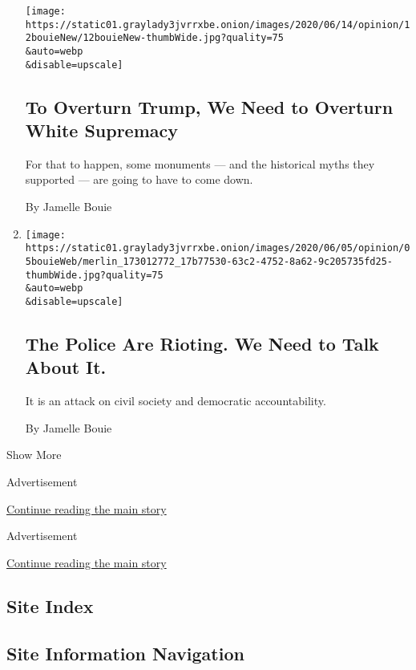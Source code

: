 \begin{enumerate}
  \texttt{[image: https://static01.graylady3jvrrxbe.onion/images/2020/06/14/opinion/12bouieNew/12bouieNew-thumbWide.jpg?quality=75\\\&auto=webp\\\&disable=upscale]}

  \hypertarget{to-overturn-trump-we-need-to-overturn-white-supremacy}{%
  \subsection{To Overturn Trump, We Need to Overturn White
  Supremacy}\label{to-overturn-trump-we-need-to-overturn-white-supremacy}}

  For that to happen, some monuments --- and the historical myths they
  supported --- are going to have to come down.

  By Jamelle Bouie
\item
  \href{/2020/06/05/opinion/sunday/police-riots.html}{}

  \texttt{[image: https://static01.graylady3jvrrxbe.onion/images/2020/06/05/opinion/05bouieWeb/merlin\_173012772\_17b77530-63c2-4752-8a62-9c205735fd25-thumbWide.jpg?quality=75\\\&auto=webp\\\&disable=upscale]}

  \hypertarget{the-police-are-rioting-we-need-to-talk-about-it}{%
  \subsection{The Police Are Rioting. We Need to Talk About
  It.}\label{the-police-are-rioting-we-need-to-talk-about-it}}

  It is an attack on civil society and democratic accountability.

  By Jamelle Bouie
\end{enumerate}

Show More

Advertisement

\protect\hyperlink{after-mid1}{Continue reading the main story}

Advertisement

\protect\hyperlink{after-mktg}{Continue reading the main story}

\hypertarget{site-index}{%
\subsection{Site Index}\label{site-index}}

\hypertarget{site-information-navigation}{%
\subsection{Site Information
Navigation}\label{site-information-navigation}}

